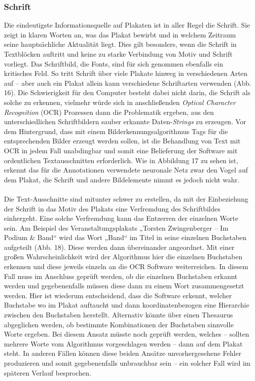 \documentclass[a4paper,12pt,ngerman]{article}
\begin{document}
\subsubsection{Schrift}
Die eindeutigste Informationsquelle auf Plakaten ist in aller Regel die Schrift. Sie zeigt in klaren Worten an, was das Plakat bewirbt und in welchem Zeitraum seine hauptsächliche Aktualität liegt. Dies gilt besonders, wenn die Schrift in Textblöcken auftritt und keine zu starke Verbindung von Motiv und Schrift vorliegt. Das Schriftbild, die Fonts, sind für sich genommen ebenfalls ein kritisches Feld. So tritt Schrift über viele Plakate hinweg in verschiedenen Arten auf -- aber auch ein Plakat allein kann verschiedene Schriftarten verwenden (Abb. 16). Die Schwierigkeit für den Computer besteht dabei nicht darin, die Schrift als solche zu erkennen, vielmehr würde sich in anschließenden \textit{Optical Character Recognition} (OCR) Prozessen dann die Problematik ergeben, aus den unterschiedlichen Schriftbildern sauber erkannte Daten-\textit{Strings} zu erzeugen. Vor dem Hintergrund, dass mit einem Bilderkennungsalgorithmus Tags für die entsprechenden Bilder erzeugt werden sollen, ist die Behandlung von Text mit OCR in jedem Fall unabdingbar und somit eine Belieferung der Software mit ordentlichen Textausschnitten erforderlich. Wie in Abbildung 17 zu sehen ist, erkennt das für die Annotationen verwendete neuronale Netz zwar den Vogel auf dem Plakat, die Schrift und andere Bildelemente nimmt es jedoch nicht wahr. \\
\\
Die Text-Ausschnitte sind mitunter schwer zu erstellen, da mit der Einbeziehung der Schrift in das Motiv des Plakats eine Verfremdung des Schriftbildes einhergeht. Eine solche Verfremdung kann das Entzerren der einzelnen Worte sein. Am Beispiel des Veranstaltungsplakats „Torsten Zwingenberger -- Im Podium \& Band“ wird das Wort „Band“ im Titel in seine einzelnen Buchstaben aufgeteilt (Abb. 18). Diese werden dann übereinander angeordnet. Mit einer großen Wahrscheinlichkeit wird der Algorithmus hier die einzelnen Buchstaben erkennen und diese jeweils einzeln an die OCR Software weiterreichen. In diesem Fall muss im Anschluss geprüft werden, ob die einzelnen Buchstaben erkannt werden und gegebenenfalls müssen diese dann zu einem Wort zusammengesetzt werden. Hier ist wiederum entscheidend, dass die Software erkennt, welcher Buchstabe wo im Plakat auftaucht und dann koordinatenbezogen eine Hierarchie zwischen den Buchstaben herstellt. Alternativ könnte über einen Thesaurus abgeglichen werden, ob bestimmte Kombinationen der Buchstaben sinnvolle Worte ergeben. Bei diesem Ansatz müsste noch geprüft werden, welches -- sollten mehrere Worte vom Algorithmus vorgeschlagen werden -- dann auf dem Plakat steht. In anderen Fällen können diese beiden Ansätze unvorhergesehene Fehler produzieren und somit gegebenenfalls unbrauchbar sein -- ein solcher Fall wird im späteren Verlauf besprochen. \\
\end{document}
